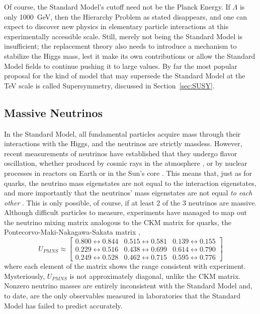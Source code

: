   Of course, the Standard Model's cutoff need not be the Planck Energy. 
  If $\Lambda$ is only 1000~GeV, then the Hierarchy Problem as stated disappears, and one can expect to discover new physics in elementary particle interactions at this experimentally accessible scale.
  Still, merely not being the Standard Model is insufficient; the replacement theory also needs to introduce a mechanism to stabilize the Higgs mass, lest it make its own contributions or allow the Standard Model fields to continue pushing it to large values.
  By far the most popular proposal for the kind of model that may supersede the Standard Model at the TeV scale is called Supersymmetry, discussed in Section~\ref{sec:SUSY}.

  \subsection{Massive Neutrinos} \label{sec:neutrinomasses}

  In the Standard Model, all fundamental particles acquire mass through their interactions with the Higgs, and the neutrinos are strictly massless.
  However, recent measurements of neutrinos have established that they undergo flavor oscillation, whether produced by cosmic rays in the atmosphere \cite{atmospheric_neutrinos}, or by nuclear processes in reactors on Earth \cite{reactor_neutrinos} or in the Sun's core \cite{solar_neutrinos}.
  This means that, just as for quarks, the neutrino mass eigenstates are not equal to the interaction eigenstates, and more importantly that the neutrinos' mass eigenstates are not equal {\it to each other} \cite{nufit}.
  This is only possible, of course, if at least 2 of the 3 neutrinos are massive.
  Although difficult particles to measure, experiments have managed to map out the neutrino mixing matrix analogous to the CKM matrix for quarks, the Pontecorvo-Maki-Nakagawa-Sakata matrix \cite{pdg},
  \begin{equation}
    U_{PMNS}
\approx
    \begin{bmatrix} 
      0.800 \leftrightarrow 0.844 & 0.515 \leftrightarrow 0.581 & 0.139 \leftrightarrow 0.155 \\
      0.229 \leftrightarrow 0.516 & 0.438 \leftrightarrow 0.699 & 0.614 \leftrightarrow 0.790 \\
      0.249 \leftrightarrow 0.528 & 0.462 \leftrightarrow 0.715 & 0.595 \leftrightarrow 0.776 
    \end{bmatrix}
  \end{equation}
  where each element of the matrix shows the range consistent with experiment.
  Mysteriously, $U_{PMNS}$ is not approximately diagonal, unlike the CKM matrix.
  Nonzero neutrino masses are entirely inconsistent with the Standard Model and, to date, are the only observables measured in laboratories that the Standard Model has failed to predict accurately.

